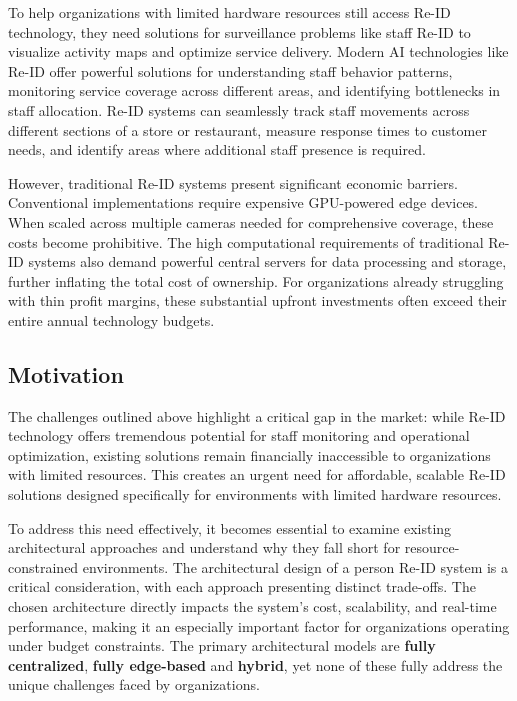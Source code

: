 \documentclass[../main.tex]{subfiles}
\begin{document}
To help organizations with limited hardware resources still access Re-ID technology, they need solutions for surveillance problems like staff Re-ID to visualize activity maps and optimize service delivery. Modern AI technologies like Re-ID offer powerful solutions for understanding staff behavior patterns, monitoring service coverage across different areas, and identifying bottlenecks in staff allocation. Re-ID systems can seamlessly track staff movements across different sections of a store or restaurant, measure response times to customer needs, and identify areas where additional staff presence is required.

However, traditional Re-ID systems present significant economic barriers. Conventional implementations require expensive GPU-powered edge devices. When scaled across multiple cameras needed for comprehensive coverage, these costs become prohibitive. The high computational requirements of traditional Re-ID systems also demand powerful central servers for data processing and storage, further inflating the total cost of ownership. For organizations already struggling with thin profit margins, these substantial upfront investments often exceed their entire annual technology budgets.

\subsection{Motivation}
\label{sec:motivation}

The challenges outlined above highlight a critical gap in the market: while Re-ID technology offers tremendous potential for staff monitoring and operational optimization, existing solutions remain financially inaccessible to organizations with limited resources. This creates an urgent need for affordable, scalable Re-ID solutions designed specifically for environments with limited hardware resources.

To address this need effectively, it becomes essential to examine existing architectural approaches and understand why they fall short for resource-constrained environments. The architectural design of a person Re-ID system is a critical consideration, with each approach presenting distinct trade-offs. The chosen architecture directly impacts the system's cost, scalability, and real-time performance, making it an especially important factor for organizations operating under budget constraints. The primary architectural models are \textbf{fully centralized}, \textbf{fully edge-based} and \textbf{hybrid}, yet none of these fully address the unique challenges faced by organizations.
\end{document}
